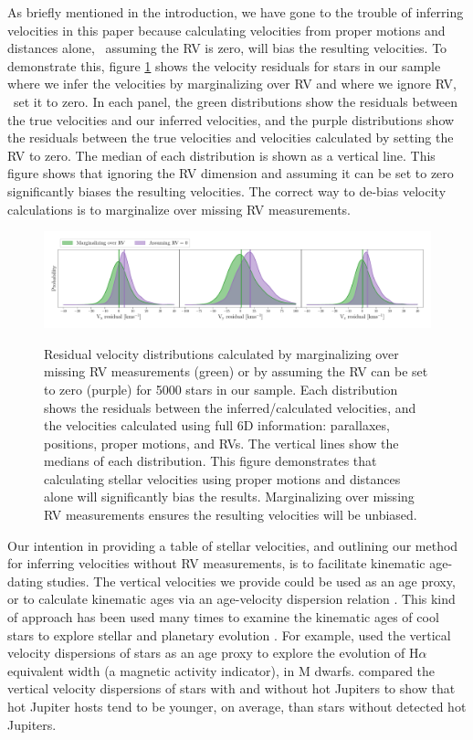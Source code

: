 As briefly mentioned in the introduction, we have gone to the trouble of
inferring velocities in this paper because calculating velocities from proper
motions and distances alone, \ie\ assuming the RV is zero, will bias the
resulting velocities.
To demonstrate this, figure \ref{fig:inferred_vs_calc} shows the velocity
residuals for stars in our sample where we infer the velocities by
marginalizing over RV and where we ignore RV, \ie\ set it to zero.
In each panel, the green distributions show the residuals between the true
velocities and our inferred velocities, and the purple distributions show the
residuals between the true velocities and velocities calculated by setting the
RV to zero.
The median of each distribution is shown as a vertical line.
This figure shows that ignoring the RV dimension and assuming it can be set to
zero significantly biases the resulting velocities.
The correct way to de-bias velocity calculations is to marginalize over
missing RV measurements.
\begin{figure}[ht!]
\caption{
Residual velocity distributions calculated by marginalizing over missing RV
    measurements (green) or by assuming the RV can be set to zero (purple) for
    5000 stars in our sample.
Each distribution shows the residuals between the inferred/calculated
    velocities, and the velocities calculated using full 6D information:
    parallaxes, positions, proper motions, and RVs.
The vertical lines show the medians of each distribution.
This figure demonstrates that calculating stellar velocities using proper
    motions and distances alone will significantly bias the results.
Marginalizing over missing RV measurements ensures the resulting velocities
    will be unbiased.
}
  \centering
    \includegraphics[width=1\textwidth]{inferred_vs_calc}
\label{fig:inferred_vs_calc}
\end{figure}

Our intention in providing a table of stellar velocities, and outlining our
method for inferring velocities without RV measurements, is to facilitate
kinematic age-dating studies.
The vertical velocities we provide could be used as an age proxy, or to
calculate kinematic ages via an age-velocity dispersion relation
\citep[\eg][]{yu2018, mackereth2019, sharma2021}.
This kind of approach has been used many times to examine the kinematic ages
of cool stars to explore stellar and planetary evolution
\citep[\eg][]{newton2016, kiman2019, hamer2019, angus2020, lu2021}.
For example, \citet{kiman2019} used the vertical velocity dispersions of stars
as an age proxy to explore the evolution of H$\alpha$ equivalent width (a
magnetic activity indicator), in M dwarfs.
\citet{hamer2019} compared the vertical velocity dispersions of stars with and
without hot Jupiters to show that hot Jupiter hosts tend to be younger, on
average, than stars without detected hot Jupiters.

